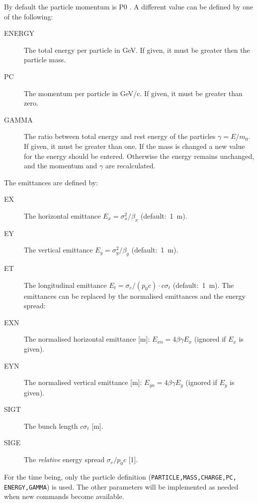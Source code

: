 By default the particle momentum is P0 .
A different value can be defined by one of the following:
\begin{description}
\item[ENERGY]
  The total energy per particle in GeV.
  If given, it must be greater then the particle mass.
\item[PC]
  The momentum per particle in GeV/c.
  If given, it must be greater than zero.
\item[GAMMA]
  The ratio between total energy and rest energy of the particles
  $\gamma = E / m_0$.
  If given, it must be greater than one.
  If the mass is changed a new value for the energy should be entered.
  Otherwise the energy remains unchanged,
  and the momentum and $\gamma$ are recalculated.
\end{description}
The emittances are defined by:
\begin{description}
\item[EX]
  The horizontal emittance
  $E_x=\sigma_x^2/\beta_x$
  (default:~1~m).
\item[EY]
  The vertical emittance
  $E_y=\sigma_y^2/\beta_y$
  (default:~1~m).
\item[ET]
  The longitudinal emittance
  $E_t=\sigma_e/(p_0c) \cdot c\sigma_t$
  (default:~1~m).
  The emittances can be replaced
  by the normalised emittances and the energy spread:
\item[EXN]
  The normalised horizontal emittance [m]:
  $E_{xn}=4\beta\gamma E_x$
  (ignored if $E_x$ is given).
\item[EYN]
  The normalised vertical emittance [m]:
  $E_{yn}=4\beta \gamma E_y$
  (ignored if $E_y$ is given).
\item[SIGT]
  The bunch length $c\sigma_t$ [m].
\item[SIGE]
  The {\em relative} energy spread $\sigma_e/p_0 c$ [1].
\end{description}
For the time being, only the particle definition
(\texttt{PARTICLE,MASS,CHARGE,PC,
ENERGY,GAMMA}) is used.
The other parameters will be implemented as needed when new commands
become available.
